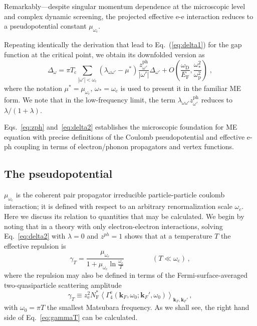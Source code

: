 \documentclass[%
 reprint,
superscriptaddress,
 amsmath,amssymb,
 aps,
prx,
]{revtex4-2}
\newcommand{\change}[2]{{\sout{#1} {\color{orange} {#2}}}}
\newcommand{\bk}{\mathbf{k}}
\newcommand{\txc}{\text{c}}
\newcommand{\txe}{\text{e}}
\newcommand{\txp}{\text{p}}
\newcommand{\txD}{\text{D}}
\newcommand{\txF}{\text{F}}
\newcommand{\txph}{\text{ph}}
\newcommand{\psp}{\mu} %
\begin{document}
Remarkably---despite singular momentum dependence at the microscopic level and complex dynamic screening, the projected effective e-e interaction reduces to a pseudopotential constant $\psp_{\omega_\txc}$. 

Repeating identically the derivation that lead to Eq.~(\ref{eq:delta1}) for the gap function at the critical point, we obtain its downfolded version as
\begin{equation}
\label{eq:delta2}
    \Delta_\omega=\pi T_\txc\sum_{|\omega'|<\omega_\txc}\left(\lambda_{\omega\omega'}-\mu^*\right) \frac{z^{\txph}_{\omega'}}{|\omega'|} \Delta_{\omega'}+O\left(\frac{\omega_\txD}{E_\txF}, \frac{\omega_*^2}{\omega_\txp^2}\right) \; ,
\end{equation}
where  the notation {$\mu^*=\mu_{\omega_\txc},\, \omega_*=\omega_\txc$} is used to present it in the familiar ME form.
{We note that in the low-frequency limit, the term $\lambda_{\omega\omega'} z^{\txph}_{\omega'}$ reduces to $\lambda/(1+\lambda)$.}

Eqs.~\eqref{eq:zph} and~\eqref{eq:delta2}  establishes the microscopic foundation for ME equation with 
precise definitions of the Coulomb pseudopotential and effective e-ph coupling in terms of electron/phonon propagators 
and vertex functions. 

\subsection{The pseudopotential}

$\psp_{\omega_\txc}$ is  the coherent pair propagator irreducible particle-particle coulomb interaction; it is defined with respect to an arbitrary renormalization scale $\omega_c$. Here we discuss its relation to quantities that may be calculated. We begin by noting that in a theory with only electron-electron interactions, solving Eq.~\ref{eq:delta2} with $\lambda=0$ and $z^{ph}=1$ shows that at a temperature $T$ the effective repulsion is
\begin{equation}
\label{eq:standard}
\gamma_T = \frac{\mu_{\omega_c}}{1 +\mu_{\omega_c} \ln \frac{\omega_\txc}{T}} \qquad \qquad (T \ll \omega_\txc) \, ,
\end{equation}
where the repulsion may also be defined in terms
of the Fermi-surface-averaged two-quasiparticle scattering amplitude
\begin{equation}
\label{eq:gammaT}
    \gamma_T \equiv z_\txe^2 N_\txF^* \left<\Gamma^\txe_4(\bk_F,\omega_0; \bk_F',\omega_0)\right>_{\bk_F,\bk_F'}\, ,
\end{equation}
with $\omega_0=\pi T$  the smallest Matsubara frequency. As we shall see, the right hand side of Eq.~\ref{eq:gammaT} can be calculated.
\end{document}
